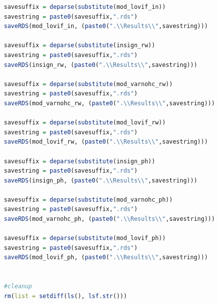 \documentclass[11pt]{article}
\begin{document}
\begin{lstlisting}[language= R]
savesuffix = deparse(substitute(mod_lovif_in))
savestring = paste0(savesuffix,".rds")
saveRDS(mod_lovif_in, (paste0(".\\Results\\",savestring)))

savesuffix = deparse(substitute(insign_rw))
savestring = paste0(savesuffix,".rds")
saveRDS(insign_rw, (paste0(".\\Results\\",savestring)))

savesuffix = deparse(substitute(mod_varnohc_rw))
savestring = paste0(savesuffix,".rds")
saveRDS(mod_varnohc_rw, (paste0(".\\Results\\",savestring)))

savesuffix = deparse(substitute(mod_lovif_rw))
savestring = paste0(savesuffix,".rds")
saveRDS(mod_lovif_rw, (paste0(".\\Results\\",savestring)))

savesuffix = deparse(substitute(insign_ph))
savestring = paste0(savesuffix,".rds")
saveRDS(insign_ph, (paste0(".\\Results\\",savestring)))

savesuffix = deparse(substitute(mod_varnohc_ph))
savestring = paste0(savesuffix,".rds")
saveRDS(mod_varnohc_ph, (paste0(".\\Results\\",savestring)))

savesuffix = deparse(substitute(mod_lovif_ph))
savestring = paste0(savesuffix,".rds")
saveRDS(mod_lovif_ph, (paste0(".\\Results\\",savestring)))


#cleanup
rm(list = setdiff(ls(), lsf.str()))
\end{lstlisting}
\end{document}
